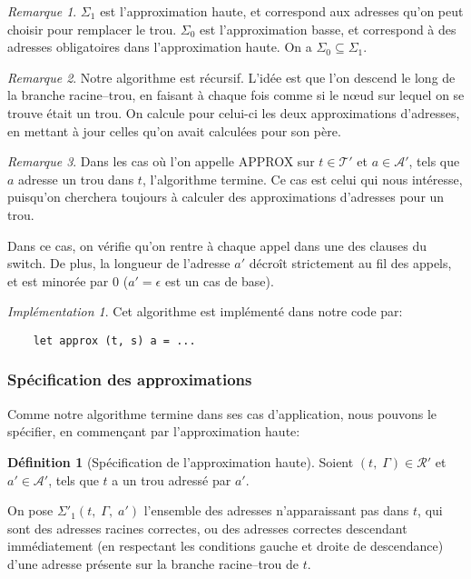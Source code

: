 \documentclass[11pt,a4paper]{article}
\theoremstyle{plain}
\theoremstyle{definition}
\newtheorem{definition}{Définition}
\theoremstyle{remark}
\newtheorem{remark}{Remarque}
\newtheorem{implementation}{Implémentation}
\newcommand*{\sequent}{\Gamma}
\newcommand*{\treeaddresses}{\ensuremath{\mathcal{A'}}}
\newcommand*{\treespartial}{\ensuremath{\mathcal{T'}}}
\newcommand*{\representationspartial}{\ensuremath{\mathcal{R'}}}
\newcommand*{\lowapprox}{\ensuremath{\Sigma_0}}
\newcommand*{\highapprox}{\ensuremath{\Sigma_1}}
\newcommand*{\highapproxspec}{\ensuremath{\Sigma'_1}}
\begin{document}
\begin{remark}
    $\highapprox$ est l'approximation haute, et correspond aux adresses qu'on peut choisir pour remplacer le trou. $\lowapprox$ est l'approximation basse, et correspond à des adresses obligatoires dans l'approximation haute.
On a $\lowapprox\subseteq\highapprox$.
\end{remark}

\begin{remark}
    \label{algo_expl}
    Notre algorithme est récursif. L'idée est que l'on descend le long de la branche racine--trou, en faisant à chaque fois comme si le n\oe ud sur lequel on se trouve était un trou. On calcule pour celui-ci les deux approximations d'adresses, en mettant à jour celles qu'on avait calculées pour son père.
\end{remark}

\begin{remark}
    Dans les cas où l'on appelle APPROX sur $t \in \treespartial$ et $a \in \treeaddresses$, tels que $a$ adresse un trou dans $t$, l'algorithme termine. Ce cas est celui qui nous intéresse, puisqu'on cherchera toujours à calculer des approximations d'adresses pour un trou.
    
    Dans ce cas, on vérifie qu'on rentre à chaque appel dans une des clauses du switch. De plus, la longueur de l'adresse $a'$ décroît strictement au fil des appels, et est minorée par 0 ($a' = \epsilon$ est un cas de base).
\end{remark}

\begin{implementation}
    Cet algorithme est implémenté dans notre code par:
    \begin{verbatim}
    let approx (t, s) a = ...
    \end{verbatim}
\end{implementation}

\subsubsection{Spécification des approximations}

Comme notre algorithme termine dans ses cas d'application, nous pouvons le spécifier, en commençant par l'approximation haute:

\begin{definition}[Spécification de l'approximation haute]
    \label{lowapprox_branch}
    Soient $(t, \; \sequent) \in \representationspartial$ et $a' \in \treeaddresses$, tels que $t$ a un trou adressé par $a'$.

    On pose $\highapproxspec \left( t, \; \sequent, \; a' \right)$ l'ensemble des adresses n'apparaissant pas dans $t$, qui sont des adresses racines correctes, ou des adresses correctes descendant immédiatement (en respectant les conditions gauche et droite de descendance) d'une adresse présente sur la branche racine--trou de $t$.
\end{definition}
\end{document}

